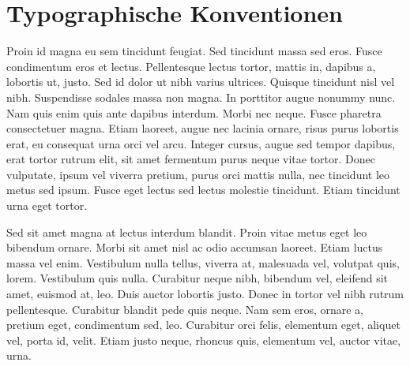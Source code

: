 \section{Typographische Konventionen}
Proin id magna eu sem tincidunt feugiat. Sed tincidunt massa sed eros. Fusce condimentum eros et lectus. Pellentesque lectus tortor, mattis in, dapibus a, lobortis ut, justo. Sed id dolor ut nibh varius ultrices. Quisque tincidunt nisl vel nibh. Suspendisse sodales massa non magna. In porttitor augue nonummy nunc. Nam quis enim quis ante dapibus interdum. Morbi nec neque. Fusce pharetra consectetuer magna. Etiam laoreet, augue nec lacinia ornare, risus purus lobortis erat, eu consequat urna orci vel arcu. Integer cursus, augue sed tempor dapibus, erat tortor rutrum elit, sit amet fermentum purus neque vitae tortor. Donec vulputate, ipsum vel viverra pretium, purus orci mattis nulla, nec tincidunt leo metus sed ipsum. Fusce eget lectus sed lectus molestie tincidunt. Etiam tincidunt urna eget tortor.

Sed sit amet magna at lectus interdum blandit. Proin vitae metus eget leo bibendum ornare. Morbi sit amet nisl ac odio accumsan laoreet. Etiam luctus massa vel enim. Vestibulum nulla tellus, viverra at, malesuada vel, volutpat quis, lorem. Vestibulum quis nulla. Curabitur neque nibh, bibendum vel, eleifend sit amet, euismod at, leo. Duis auctor lobortis justo. Donec in tortor vel nibh rutrum pellentesque. Curabitur blandit pede quis neque. Nam sem eros, ornare a, pretium eget, condimentum sed, leo. Curabitur orci felis, elementum eget, aliquet vel, porta id, velit. Etiam justo neque, rhoncus quis, elementum vel, auctor vitae, urna.
